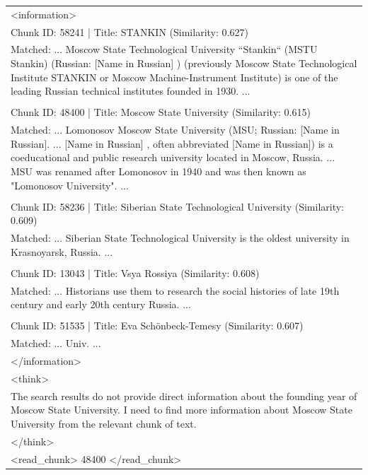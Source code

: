 \documentclass[11pt]{article}
\begin{document}
\begin{longtable}{|p{}|}
\textless{}information\textgreater{} \\
Chunk ID: 58241 | Title: STANKIN (Similarity: 0.627) \\
Matched: ... Moscow State Technological University “Stankin“ (MSTU Stankin) (Russian: [Name in Russian] ) (previously Moscow State Technological Institute STANKIN or Moscow Machine-Instrument Institute) is one of the leading Russian technical institutes founded in 1930. ... \\
\\
Chunk ID: 48400 | Title: Moscow State University (Similarity: 0.615) \\
Matched: ... Lomonosov Moscow State University (MSU; Russian: [Name in Russian]. ... [Name in Russian] , often abbreviated [Name in Russian]) is a coeducational and public research university located in Moscow, Russia. ... MSU was renamed after Lomonosov in 1940 and was then known as "Lomonosov University". ... \\
\\
Chunk ID: 58236 | Title: Siberian State Technological University (Similarity: 0.609) \\
Matched: ... Siberian State Technological University is the oldest university in Krasnoyarsk, Russia. ... \\
\\
Chunk ID: 13043 | Title: Vsya Rossiya (Similarity: 0.608) \\
Matched: ... Historians use them to research the social histories of late 19th century and early 20th century Russia. ... \\
\\
Chunk ID: 51535 | Title: Eva Schönbeck-Temesy (Similarity: 0.607) \\
Matched: ... Univ. ... \\
\textless{}/information\textgreater{} \\
\hline

\textless{}think\textgreater{} \\
The search results do not provide direct information about the founding year of Moscow State University. I need to find more information about Moscow State University from the relevant chunk of text. \\
\textless{}/think\textgreater{} \\
\textless{}read\_chunk\textgreater{} 48400 \textless{}/read\_chunk\textgreater{} \\
\hline


\end{longtable}
\end{document}
